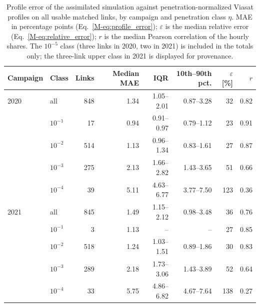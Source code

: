 \begin{table}[htbp]
\centering
\caption{Profile error of the assimilated simulation against penetration-normalized Viasat profiles on all usable matched links, by campaign and penetration class $\eta$. MAE in percentage points (Eq.~\eqref{M-eq:profile_error}); $\varepsilon$ is the median relative error (Eq.~\eqref{M-eq:relative_error}); $r$ is the median Pearson correlation of the hourly shares. The $10^{-5}$ class (three links in 2020, two in 2021) is included in the totals only; the three-link upper class in 2021 is displayed for provenance.}
\label{tab:validation_all}
\begin{tabular}{@{}llrrrrrr@{}}
\toprule
Campaign & Class & Links & Median MAE & IQR & 10th--90th pct. & $\varepsilon$ [\%] & $r$ \\
\midrule
2020 & all & 848 & 1.34 & 1.05--2.01 & 0.87--3.28 & 32 & 0.82 \\
 & $10^{-1}$ & 17 & 0.94 & 0.91--0.97 & 0.79--1.12 & 23 & 0.91 \\
 & $10^{-2}$ & 514 & 1.13 & 0.96--1.34 & 0.83--1.61 & 27 & 0.87 \\
 & $10^{-3}$ & 275 & 2.13 & 1.66--2.82 & 1.43--3.65 & 51 & 0.66 \\
 & $10^{-4}$ & 39 & 5.11 & 4.63--6.77 & 3.77--7.50 & 123 & 0.36 \\
\midrule
2021 & all & 845 & 1.49 & 1.15--2.12 & 0.98--3.48 & 36 & 0.76 \\
 & $10^{-1}$ & 3 & 1.13 & -- & -- & 27 & 0.85 \\
 & $10^{-2}$ & 518 & 1.24 & 1.03--1.51 & 0.89--1.86 & 30 & 0.83 \\
 & $10^{-3}$ & 289 & 2.18 & 1.73--3.06 & 1.43--3.89 & 52 & 0.64 \\
 & $10^{-4}$ & 33 & 5.75 & 4.86--6.82 & 4.67--7.64 & 138 & 0.27 \\
\bottomrule
\end{tabular}
\end{table}

